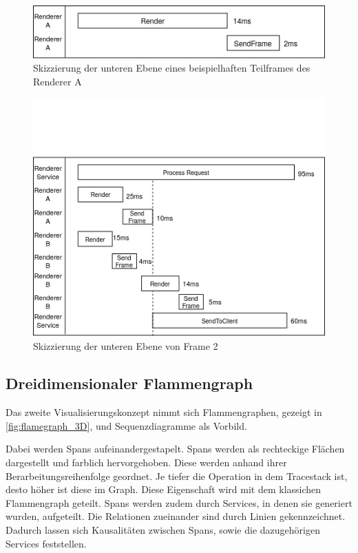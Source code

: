 \begin{figure}[!ht]
	\centering
	\includegraphics[scale=0.8]{img/Design/FrameGalerieUntereEbene2.png}
	\caption[Untere Ebene der Frame Galerie: Beispiel 2]{ Skizzierung der unteren Ebene eines beispielhaften Teilframes des Renderer A}
	\label{fig:FrameGalerieUntereEbene1}
\end{figure}
\begin{figure}[!ht]
	\centering
	\includegraphics[scale=0.8]{img/Design/FrameGalerieUntereEbene1.png}
	\caption[Untere Ebene der Frame Galerie: Beispiel 1]{ Skizzierung der unteren Ebene von Frame 2}
	\label{fig:FrameGalerieUntereEbene2}
\end{figure}

\subsection{Dreidimensionaler Flammengraph}
\label{subsection:Dreidimensionale Flammengraphen}

Das zweite Visualisierungskonzept nimmt sich Flammengraphen, gezeigt in \cref{fig:flamegraph_3D}, und Sequenzdiagramme als Vorbild.

Dabei werden Spans aufeinandergestapelt. Spans werden als rechteckige Flächen dargestellt und farblich hervorgehoben.	Diese werden anhand ihrer Berarbeitungsreihenfolge geordnet. Je tiefer die Operation in dem Tracestack ist, desto höher ist diese im Graph. Diese Eigenschaft wird mit dem klassichen Flammengraph geteilt. Spans werden zudem durch Services, in denen sie generiert wurden, aufgeteilt. Die Relationen zueinander sind durch Linien gekennzeichnet. Dadurch lassen sich Kausalitäten zwischen Spans, sowie die dazugehörigen Services feststellen.

